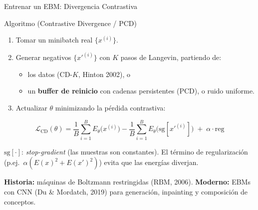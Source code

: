 \documentclass[aspectratio=169, 10pt]{beamer}
\newcommand{\formula}[1]{%
	\begin{tcolorbox}[colback=UCMBlue!8, colframe=UCMBlue, arc=4pt,
		boxsep=2pt, left=6pt, right=6pt, top=3pt, bottom=3pt]
		#1
	\end{tcolorbox}
}
\begin{document}
\begin{frame}[shrink]{Entrenar un EBM: Divergencia Contrastiva}

	\begin{block}{Algoritmo (Contrastive Divergence / PCD)}
		\small
		\begin{enumerate}
			\item Tomar un minibatch real $\{x^{(i)}\}$.
			\item Generar negativos $\{x'^{(i)}\}$ con $K$ pasos de Langevin, partiendo de:
			\begin{itemize}
				\item los datos (CD-$K$, Hinton 2002), o
				\item un \textbf{buffer de reinicio} con cadenas persistentes (PCD), o ruido uniforme.
			\end{itemize}
			\item Actualizar $\theta$ minimizando la p\'erdida contrastiva:
		\end{enumerate}
	\end{block}

	\formula{
		\[
		\mathcal{L}_{\text{CD}}(\theta) = \frac{1}{B}\sum_{i=1}^B E_\theta\big(x^{(i)}\big) - \frac{1}{B}\sum_{i=1}^B E_\theta\big(\mathrm{sg}[x'^{(i)}]\big) \;+\; \alpha \cdot \text{reg}
		\]
	}

	\small $\mathrm{sg}[\cdot]$: \textit{stop-gradient} (las muestras son constantes). El t\'ermino de regularizaci\'on (p.ej.\ $\alpha(E(x)^2 + E(x')^2)$) evita que las energ\'ias diverjan.

	\vspace{0.1cm}

	\small \textbf{Historia:} m\'aquinas de Boltzmann restringidas (RBM, 2006). \textbf{Moderno:} EBMs con CNN (Du \& Mordatch, 2019) para generaci\'on, inpainting y composici\'on de conceptos.

\end{frame}
\end{document}
